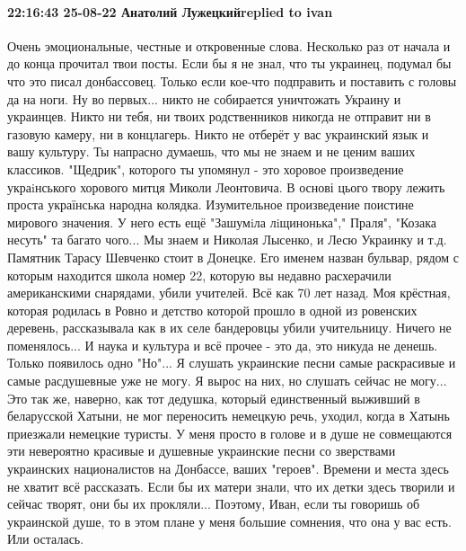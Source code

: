  
 
 
 
 

\paragraph{22:16:43 25-08-22 Анатолий Лужецкийreplied to ivan}

Очень эмоциональные, честные и откровенные слова.   Несколько раз от начала и
до конца прочитал твои посты. Если бы я не знал, что ты украинец, подумал бы
что это писал донбассовец. Только если кое-что подправить и поставить с головы
да на ноги. Ну во первых... никто не собирается уничтожать Украину и украинцев.
Никто  ни тебя, ни твоих родственников никогда не отправит ни в газовую камеру,
ни в концлагерь. Никто не отберёт у вас украинский язык и вашу культуру. Ты
напрасно думаешь, что мы не знаем и не ценим ваших классиков. "Щедрик",
которого ты упомянул - это хоровое произведение украiнського хорового митця
Миколи Леонтовича. В основі цього твору лежить проста українська народна
колядка. Изумительное произведение поистине мирового значения. У него есть ещё
"Зашумiла лiщинонька"," Праля", "Козака несуть" та багато чого... Мы знаем и
Николая Лысенко, и Лесю Украинку и т.д.  Памятник  Тарасу Шевченко стоит в
Донецке. Его именем назван бульвар, рядом с которым находится школа номер 22,
которую вы недавно расхерачили американскими снарядами, убили учителей. Всё как
70 лет назад. Моя крёстная, которая родилась в Ровно и детство которой прошло в
одной из ровенских деревень, рассказывала как в их селе бандеровцы убили
учительницу. Ничего не поменялось... И наука и культура и всё прочее - это да,
это никуда не денешь. Только появилось одно "Но"... Я слушать украинские песни
самые раскрасивые и самые расдушевные уже  не могу. Я вырос на них, но слушать
сейчас не могу... Это так же, наверно, как тот дедушка, который единственный
выживший в беларусской Хатыни, не мог переносить немецкую речь, уходил, когда в
Хатынь приезжали немецкие туристы. У меня просто в голове и в душе не
совмещаются эти невероятно красивые и душевные украинские песни со зверствами
украинских националистов на Донбассе, ваших "героев". Времени и места здесь не
хватит всё рассказать. Если бы их матери знали,  что их детки здесь творили и
сейчас творят, они бы их прокляли... Поэтому, Иван, если ты говоришь об
украинской душе, то в этом плане у меня большие сомнения, что она у вас есть.
Или осталась.
